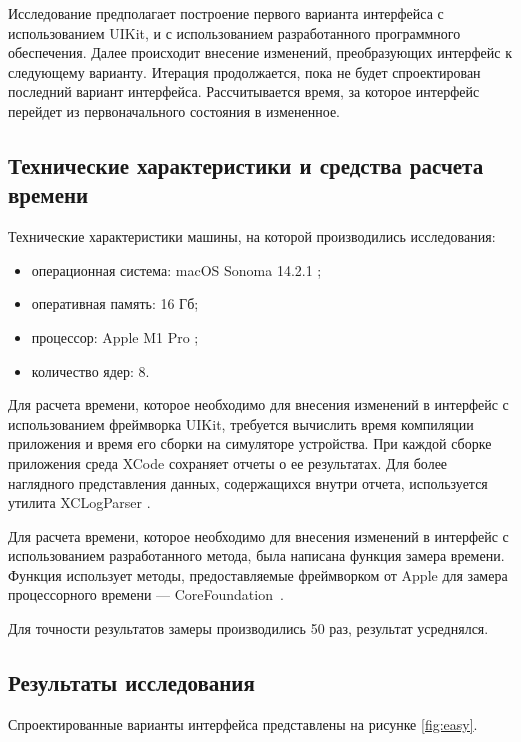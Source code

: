 Исследование предполагает построение первого варианта интерфейса с использованием UIKit, и с использованием разработанного программного обеспечения.
Далее происходит внесение изменений, преобразующих интерфейс к следующему варианту.
Итерация продолжается, пока не будет спроектирован последний вариант интерфейса.
Рассчитывается время, за которое интерфейс перейдет из первоначального состояния в измененное. 
\subsection{Технические характеристики и средства расчета времени}

Технические характеристики машины, на которой производились исследования:
\begin{itemize}[label=---]
	\item операционная система: macOS Sonoma 14.2.1 \cite{sonoma};
	\item оперативная память: 16 Гб;
	\item процессор: Apple M1 Pro \cite{m1};
	\item количество ядер: 8.
\end{itemize}

Для расчета времени, которое необходимо для внесения изменений в интерфейс с использованием фреймворка UIKit, требуется вычислить время компиляции приложения и время его сборки на симуляторе устройства.
При каждой сборке приложения среда XCode сохраняет отчеты о ее результатах.
Для более наглядного представления данных, содержащихся внутри отчета, используется утилита XCLogParser \cite{log}.

Для расчета времени, которое необходимо для внесения изменений в интерфейс с использованием разработанного метода, была написана функция замера времени. 
Функция использует методы, предоставляемые фреймворком от Apple для замера процессорного времени --- CoreFoundation~\cite{corefoundation}.

Для точности результатов замеры производились 50 раз, результат усреднялся.

\subsection{Результаты исследования}

Спроектированные варианты интерфейса представлены на рисунке \ref{fig:easy}.

